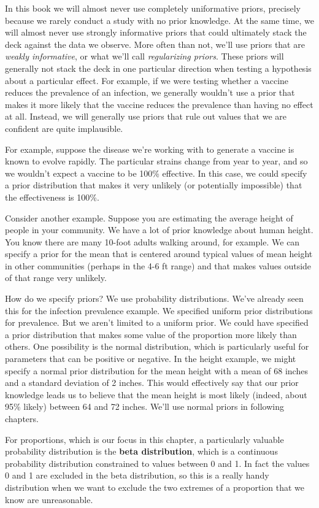 \documentclass[
]{book}
\begin{document}
In this book we will almost never use completely uniformative priors, precisely because we rarely conduct a study with no prior knowledge. At the same time, we will almost never use strongly informative priors that could ultimately stack the deck against the data we observe. More often than not, we'll use priors that are \emph{weakly informative}, or what we'll call \emph{regularizing priors}. These priors will generally not stack the deck in one particular direction when testing a hypothesis about a particular effect. For example, if we were testing whether a vaccine reduces the prevalence of an infection, we generally wouldn't use a prior that makes it more likely that the vaccine reduces the prevalence than having no effect at all. Instead, we will generally use priors that rule out values that we are confident are quite implausible.

For example, suppose the disease we're working with to generate a vaccine is known to evolve rapidly. The particular strains change from year to year, and so we wouldn't expect a vaccine to be 100\% effective. In this case, we could specify a prior distribution that makes it very unlikely (or potentially impossible) that the effectiveness is 100\%.

Consider another example. Suppose you are estimating the average height of people in your community. We have a lot of prior knowledge about human height. You know there are many 10-foot adults walking around, for example. We can specify a prior for the mean that is centered around typical values of mean height in other communities (perhaps in the 4-6 ft range) and that makes values outside of that range very unlikely.

How do we specify priors? We use probability distributions. We've already seen this for the infection prevalence example. We specified uniform prior distributions for prevalence. But we aren't limited to a uniform prior. We could have specified a prior distribution that makes some value of the proportion more likely than others. One possibility is the normal distribution, which is particularly useful for parameters that can be positive or negative. In the height example, we might specify a normal prior distribution for the mean height with a mean of 68 inches and a standard deviation of 2 inches. This would effectively say that our prior knowledge leads us to believe that the mean height is most likely (indeed, about 95\% likely) between 64 and 72 inches. We'll use normal priors in following chapters.

For proportions, which is our focus in this chapter, a particularly valuable probability distribution is the \textbf{beta distribution}, which is a continuous probability distribution constrained to values between 0 and 1. In fact the values 0 and 1 are excluded in the beta distribution, so this is a really handy distribution when we want to exclude the two extremes of a proportion that we know are unreasonable.
\end{document}
